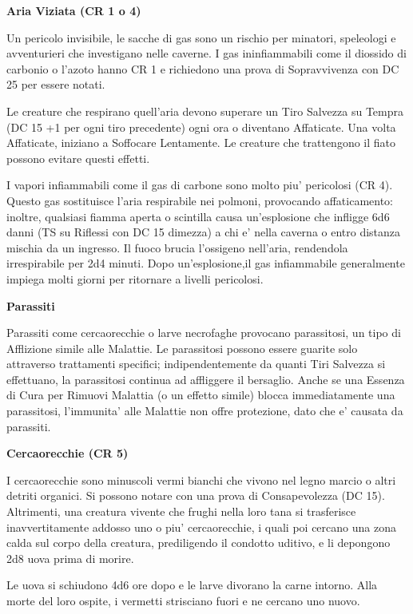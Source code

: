 \documentclass[a4paper,11pt,twoside,openany]{book}
\begin{document}
{		\textbf{Aria Viziata (CR 1 o 4)}
		
		Un pericolo invisibile, le sacche di gas sono un rischio per minatori, speleologi e avventurieri che investigano nelle caverne. I gas ininfiammabili come il diossido di carbonio o l'azoto hanno CR 1 e richiedono una prova di Sopravvivenza con DC 25 per essere notati. 
		
		Le creature che respirano quell'aria devono superare un Tiro Salvezza su Tempra (DC 15 +1 per ogni tiro precedente) ogni ora o diventano Affaticate. Una volta Affaticate, iniziano a Soffocare Lentamente. Le creature che trattengono il fiato possono evitare questi effetti.
		
		I vapori infiammabili come il gas di carbone sono molto piu' pericolosi (CR 4). Questo gas sostituisce l'aria respirabile nei polmoni, provocando affaticamento: inoltre, qualsiasi fiamma aperta o scintilla causa un'esplosione che infligge 6d6 danni (TS su Riflessi con DC 15 dimezza) a chi e' nella caverna o entro distanza mischia da un ingresso. Il fuoco brucia l'ossigeno nell'aria, rendendola irrespirabile per 2d4 minuti. Dopo un'esplosione,il gas infiammabile generalmente impiega molti giorni per ritornare a livelli pericolosi.
		
		\textbf{Parassiti}
		
		Parassiti come cercaorecchie o larve necrofaghe provocano parassitosi, un tipo di Afflizione simile alle Malattie. Le parassitosi possono essere guarite solo attraverso trattamenti specifici; indipendentemente da quanti Tiri Salvezza si effettuano, la parassitosi continua ad affliggere il bersaglio. Anche se una Essenza di Cura per Rimuovi Malattia (o un effetto simile) blocca immediatamente una parassitosi, l'immunita' alle Malattie non offre protezione, dato che e' causata da parassiti.
		
		\textbf{Cercaorecchie (CR 5)}
		
		I cercaorecchie sono minuscoli vermi bianchi che vivono nel legno marcio o altri detriti organici. Si possono notare con una prova di Consapevolezza (DC 15). Altrimenti, una creatura vivente che frughi nella loro tana si trasferisce inavvertitamente addosso uno o piu' cercaorecchie, i quali poi cercano una zona calda sul corpo della creatura, prediligendo il condotto uditivo, e li depongono 2d8 uova prima di morire. 
		
		Le uova si schiudono 4d6 ore dopo e le larve divorano la carne intorno. Alla morte del loro ospite, i vermetti strisciano fuori e ne cercano uno nuovo.
		
}
\end{document}
